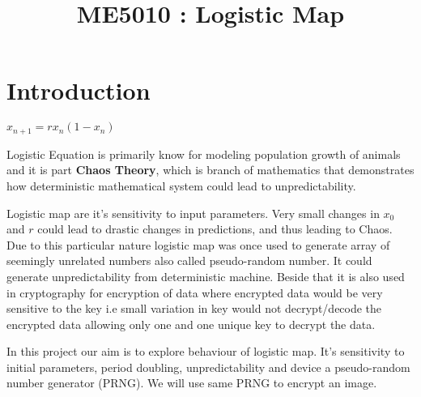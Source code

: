 \documentclass{report}
\title{\textbf{ME5010 : Logistic Map}}
\begin{document}
\maketitle

\section{Introduction}

\begin{center}$x_{n+1} = rx_n(1-x_n)$\end{center}
Logistic Equation is primarily know for modeling population growth of animals and it is part \textbf{Chaos Theory}, which is branch of mathematics that demonstrates how deterministic mathematical system could lead to unpredictability.

Logistic map are it's sensitivity to input parameters. Very small changes in $x_0$ and $r$ could lead to drastic changes in predictions, and thus leading to Chaos. Due to this particular nature logistic map was once used to generate array of seemingly unrelated numbers also called pseudo-random number. It could generate unpredictability from deterministic machine. Beside that it is also used in cryptography for encryption of data where encrypted data would be very sensitive to the key i.e small variation in key would not decrypt/decode the encrypted data allowing only one and one unique key to decrypt the data.

In this project our aim is to explore behaviour of logistic map. It's sensitivity to initial parameters, period doubling, unpredictability and device a pseudo-random number generator (PRNG). We will use same PRNG to encrypt an image.
\end{document}
